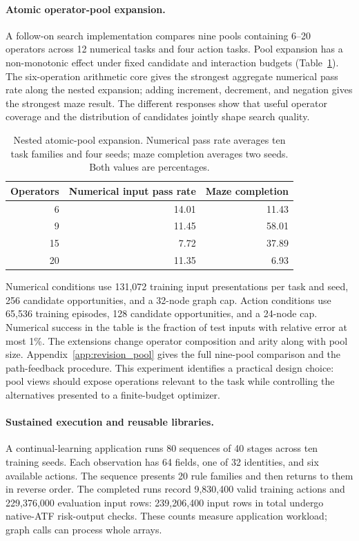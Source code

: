 \paragraph{Atomic operator-pool expansion.}
A follow-on search implementation compares nine pools containing 6--20 operators across 12 numerical tasks and four action tasks. Pool expansion has a non-monotonic effect under fixed candidate and interaction budgets (Table~\ref{tab:pool_expansion_main}). The six-operation arithmetic core gives the strongest aggregate numerical pass rate along the nested expansion; adding increment, decrement, and negation gives the strongest maze result. The different responses show that useful operator coverage and the distribution of candidates jointly shape search quality.

\begin{table}[tb]
\centering\small
\caption{Nested atomic-pool expansion. Numerical pass rate averages ten task families and four seeds; maze completion averages two seeds. Both values are percentages.}
\label{tab:pool_expansion_main}
\begin{tabular}{rrr}
\toprule
Operators & Numerical input pass rate & Maze completion \\
\midrule
6 & 14.01 & 11.43 \\
9 & 11.45 & 58.01 \\
15 & 7.72 & 37.89 \\
20 & 11.35 & 6.93 \\
\bottomrule
\end{tabular}
\end{table}

Numerical conditions use 131,072 training input presentations per task and seed, 256 candidate opportunities, and a 32-node graph cap. Action conditions use 65,536 training episodes, 128 candidate opportunities, and a 24-node cap. Numerical success in the table is the fraction of test inputs with relative error at most 1\%. The extensions change operator composition and arity along with pool size. Appendix~\ref{app:revision_pool} gives the full nine-pool comparison and the path-feedback procedure. This experiment identifies a practical design choice: pool views should expose operations relevant to the task while controlling the alternatives presented to a finite-budget optimizer.

\paragraph{Sustained execution and reusable libraries.}
A continual-learning application runs 80 sequences of 40 stages across ten training seeds. Each observation has 64 fields, one of 32 identities, and six available actions. The sequence presents 20 rule families and then returns to them in reverse order. The completed runs record 9,830,400 valid training actions and 229,376,000 evaluation input rows: 239,206,400 input rows in total undergo native-ATF risk-output checks. These counts measure application workload; graph calls can process whole arrays.

